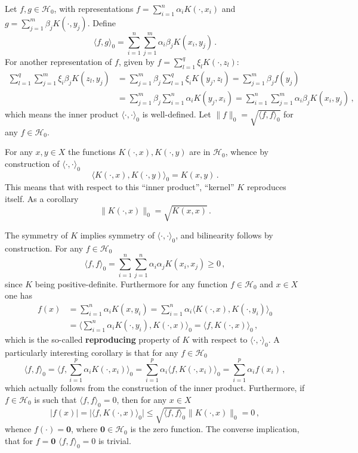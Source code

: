 \documentclass[a4paper]{article}
\newcommand{\nil}{\mathbf{0}}
\newcommand{\Hcal}{\mathcal{H}}
\begin{document}
Let $f,g\in \Hcal_0$, with representations $f = \sum_{i=1}^n \alpha_i K(\cdot, x_i)$ and
$g = \sum_{j=1}^m \beta_j K(\cdot, y_j)$. Define
\[ \langle f, g \rangle_0 = \sum_{i=1}^n \sum_{j=1}^m \alpha_i \beta_j K(x_i, y_j)\,. \]
For another representation of $f$, given by $f = \sum_{l=1}^q \xi_l K(\cdot, z_l)$:
\begin{align*}
	\sum_{l=1}^q \sum_{j=1}^m \xi_i \beta_j K(z_l, y_j)
	&= \sum_{j=1}^m \beta_j \sum_{l=1}^q \xi_i K(y_j, z_l) 
	 = \sum_{j=1}^m \beta_j f(y_j) \\
	&= \sum_{j=1}^m \beta_j \sum_{i=1}^n \alpha_i K(y_j, x_i) 
	 = \sum_{i=1}^n \sum_{j=1}^m \alpha_i \beta_j K(x_i, y_j) \,,
\end{align*}
which means the inner product $\langle \cdot,\cdot \rangle_0$ is well-defined.
Let $\|f\|_0 = \sqrt{\langle f, f\rangle_0}$ for any $f\in \Hcal_0$.

For any $x,y\in X$ the functions $K(\cdot,x), K(\cdot,y)$ are in $\Hcal_0$, whence
by construction of $\langle\cdot,\cdot\rangle_0$
\[ \langle K(\cdot,x), K(\cdot,y) \rangle_0 = K(x,y) \,.\]
This means that with respect to this ``inner product'', ``kernel'' $K$ reproduces itself.
As a corollary 
\[ \| K(\cdot,x) \|_0 = \sqrt{ K(x,x) } \,.\]

The symmetry of $K$ implies symmetry of $\langle \cdot,\cdot \rangle_0$, and
bilinearity follows by construction. For any $f\in \Hcal_0$
\[ \langle f, f \rangle_0 = \sum_{i=1}^n \sum_{j=1}^n \alpha_i \alpha_j K(x_i, x_j) \geq 0\,, \]
since $K$ being positive-definite. Furthermore for any function $f\in \Hcal_0$
and $x\in X$ one has
\begin{align*}
	f(x) &= \sum_{i=1}^n \alpha_i K(x, y_i)
	 = \sum_{i=1}^n \alpha_i \langle K(\cdot,x), K(\cdot,y_i) \rangle_0 \\
	&= \bigl\langle \sum_{i=1}^n \alpha_i K(\cdot,y_i), K(\cdot,x) \bigr\rangle_0 
	 = \langle f, K(\cdot,x) \rangle_0 \,,
\end{align*}
which is the so-called \textbf{reproducing} property of $K$ with respect to $\langle \cdot,\cdot \rangle_0$.
A particularly interesting corollary is that for any $f\in \Hcal_0$
\[
\langle f, f \rangle_0
= \bigl\langle f, \sum_{i=1}^p \alpha_i K(\cdot, x_i) \bigr\rangle_0
= \sum_{i=1}^p \alpha_i \langle f, K(\cdot, x_i) \rangle_0
= \sum_{i=1}^p \alpha_i f(x_i)\,,
\]
which actually follows from the construction of the inner product. Furthermore,
if $f\in \Hcal_0$ is such that $\langle f, f\rangle_0 = 0$, then for any $x\in X$
\[
|f(x)|
= \bigl| \langle f, K(\cdot,x) \rangle_0 \bigr|
\leq \sqrt{ \langle f,f\rangle_0 } \|K(\cdot,x)\|_0
= 0 \,,
\]
whence $f(\cdot) = \nil$, where $\nil\in \Hcal_0$ is the zero function. The converse
implication, that for $f=\nil$ $\langle f,f\rangle_0 = 0$ is trivial.
\end{document}
